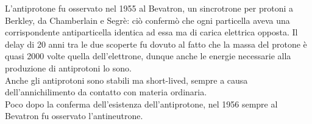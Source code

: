 L'antiprotone fu osservato nel 1955 al Bevatron, un sincrotrone per protoni a Berkley, da Chamberlain e Segrè: ciò confermò che ogni particella aveva una corrispondente antiparticella identica ad essa ma di carica elettrica opposta. Il delay di 20 anni tra le due scoperte fu dovuto al fatto che la massa del protone è quasi 2000 volte quella dell'elettrone, dunque anche le energie necessarie alla produzione di antiprotoni lo sono.\\
Anche gli antiprotoni sono stabili ma short-lived, sempre a causa dell'annichilimento da contatto con materia ordinaria.\\
Poco dopo la conferma dell'esistenza dell'antiprotone, nel 1956 sempre al Bevatron fu osservato l'antineutrone.


